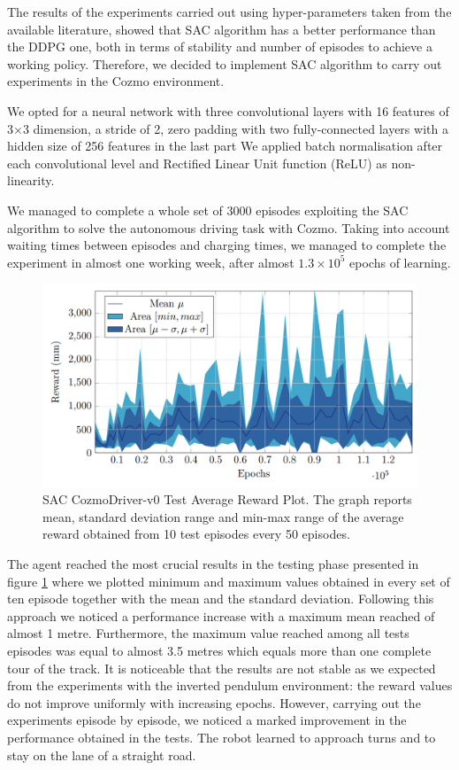 \documentclass[10pt,twocolumn,letterpaper]{article}
\begin{document}
The results of the experiments carried out using hyper-parameters taken from the available literature, showed that SAC algorithm has a better performance than the DDPG one, both in terms of stability and number of episodes to achieve a working policy. Therefore, we decided to implement SAC algorithm to carry out experiments in the Cozmo environment.

We opted for a neural network with three convolutional layers with 16 features of 3$\times$3 dimension, a stride of 2, zero padding with two fully-connected layers with a hidden size of 256 features in the last part
We applied batch normalisation after each convolutional level and Rectified Linear Unit function (ReLU) as non-linearity.

We managed to complete a whole set of 3000 episodes exploiting the SAC algorithm to solve the autonomous driving task with Cozmo.
Taking into account waiting times between episodes and charging times, we managed to complete the experiment in almost one working week, after almost $1.3\times 10^5$ epochs of learning.

\begin{figure}[tbp]
    \centering
    \includegraphics[width=0.97\columnwidth]{test_confidence.png}
    \caption[SAC CozmoDriver-v0 Test Average Reward Plot]{SAC CozmoDriver-v0 Test Average Reward Plot. The graph reports mean, standard deviation range and min-max range of the average reward obtained from 10 test episodes every 50 episodes.}
    \label{confidence}
\end{figure}

The agent reached the most crucial results in the testing phase presented in figure \ref{confidence} where we plotted minimum and maximum values obtained in every set of ten episode together with the mean and the standard deviation.
Following this approach we noticed a performance increase with a maximum mean reached of almost 1 metre.
Furthermore, the maximum value reached among all tests episodes was equal to almost 3.5 metres which equals more than one complete tour of the track.
It is noticeable that the results are not stable as we expected from the experiments with the inverted pendulum environment: the reward values do not improve uniformly with increasing epochs.
However, carrying out the experiments episode by episode, we noticed a marked improvement in the performance obtained in the tests. The robot learned to approach turns and to stay on the lane of a straight road.
\end{document}
